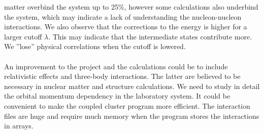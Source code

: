 matter  overbind the system up to 25\%, however some calculations also underbind
the system, which may indicate a lack of understanding the nucleon-nucleon interactions.
We also observe that the corrections to the energy is higher for a larger cutoff
$\lambda$. This may indicate that the intermediate states contribute more. 
We ''lose'' physical correlations when the cutoff is lowered.\\ 
\\
An improvement to the project and the
calculations could be to include relativistic effects and three-body interactions. The latter 
are believed to be necessary in nuclear matter and structure calculations. We need to study in detail the orbital momentum dependency in the laboratory system.  
It could be 
convenient to make the coupled cluster program more efficient. The interaction 
files are huge and require much memory when the program stores the interactions
in arrays.   
